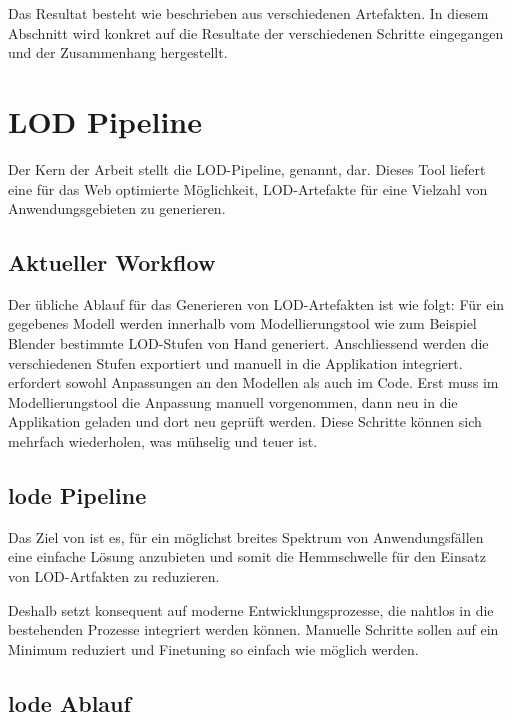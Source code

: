 Das Resultat besteht wie beschrieben aus verschiedenen Artefakten. In diesem Abschnitt wird konkret auf die Resultate der verschiedenen Schritte eingegangen und der Zusammenhang hergestellt.

\section{LOD Pipeline}

Der Kern der Arbeit stellt die LOD-Pipeline,  genannt, dar. Dieses Tool liefert eine für das Web optimierte Möglichkeit, LOD-Artefakte für eine Vielzahl von Anwendungsgebieten zu generieren.

\subsection{Aktueller Workflow}

Der übliche Ablauf für das Generieren von LOD-Artefakten ist wie folgt:
Für ein gegebenes Modell werden innerhalb vom Modellierungstool wie zum Beispiel Blender bestimmte LOD-Stufen von Hand generiert. Anschliessend werden die verschiedenen Stufen exportiert und manuell in die Applikation integriert.  erfordert sowohl Anpassungen an den Modellen als auch im Code. Erst muss im Modellierungstool die Anpassung manuell vorgenommen, dann neu in die Applikation geladen und dort neu geprüft werden. Diese Schritte können sich mehrfach wiederholen, was mühselig und teuer ist.

\subsection{lode Pipeline}

Das Ziel von  ist es, für ein möglichst breites Spektrum von Anwendungsfällen eine einfache Lösung anzubieten und somit die Hemmschwelle für den Einsatz von LOD-Artfakten zu reduzieren.

Deshalb setzt  konsequent auf moderne Entwicklungsprozesse, die nahtlos in die bestehenden Prozesse integriert werden können. Manuelle Schritte sollen auf ein Minimum reduziert und Finetuning so einfach wie möglich werden.

\subsection{lode Ablauf}

